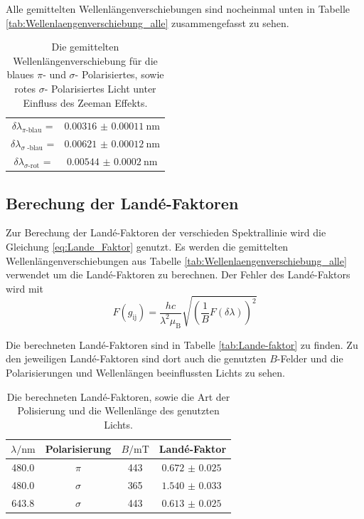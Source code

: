 Alle gemittelten Wellenlängenverschiebungen sind nocheinmal unten in Tabelle \autoref{tab:Wellenlaengenverschiebung_alle} zusammengefasst zu sehen.

\begin{table}
    \centering
    \caption{Die gemittelten Wellenlängenverschiebung für die blaues $\pi$- und $\sigma$- Polarisiertes, sowie rotes $\sigma$- Polarisiertes Licht unter Einfluss des Zeeman Effekts.}
    \begin{tabular}{cc}
        \midrule
        $\delta \lambda _\text{$\pi$-blau}$ = & $\SI{0.00316(011)}{\nano\meter}$ \\
        $\delta \lambda _\text{$\sigma$ -blau}$ =& $\SI{0.00621(012)}{\nano\meter}$ \\
        $\delta \lambda _\text{$\sigma$-rot}$ =&  $\SI{0.00544(020)}{\nano\meter}$ \\
        \bottomrule
    \end{tabular}
    \label{tab:Wellenlaengenverschiebung_alle}
\end{table}

\subsection{Berechung der Landé-Faktoren}

Zur Berechung der Landé-Faktoren der verschieden Spektrallinie wird die Gleichung \eqref{eq:Lande_Faktor} genutzt.
Es werden die gemittelten Wellenlängenverschiebungen aus Tabelle \autoref{tab:Wellenlaengenverschiebung_alle} verwendet um die Landé-Faktoren zu berechnen.
Der Fehler des Landé-Faktors wird mit 
\begin{equation*}
    F(g_\text{ij}) = \frac{hc}{\lambda^2 \mu _\text{B}} \sqrt{\left ( \frac{1}{B} F(\delta \lambda) \right)^2}
\end{equation*}

Die berechneten Landé-Faktoren sind in Tabelle \autoref{tab:Lande-faktor} zu finden.
Zu den jeweiligen Landé-Faktoren sind dort auch die genutzten $B$-Felder und die Polarisierungen und Wellenlängen beeinflussten Lichts zu sehen.

\begin{table}
    \centering
    \caption{Die berechneten Landé-Faktoren, sowie die Art der Polisierung und die Wellenlänge des genutzten Lichts.}
    \begin{tabular}{cccc}
        \toprule
        $\lambda / \si{\nano\meter}$ & Polarisierung & $B / \si{\milli\tesla}$ & Landé-Faktor \\
        \midrule
        480.0 & $\pi$ & 443 & $\SI{0.672(25)}{}$ \\
        480.0 & $\sigma$ & 365 & $\SI{1.540(33)}{}$ \\
        643.8 & $\sigma$ & 443 & $\SI{0.613(25)}{}$ \\
        \bottomrule
    \end{tabular}
    \label{tab:Lande-Faktor}
\end{table}

